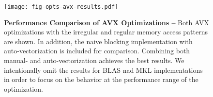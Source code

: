 
\begin{figure}[b]

  \centering
  \texttt{[image: fig-opts-avx-results.pdf]}

  \caption{\textbf{Performance Comparison of AVX Optimizations --}
    Both AVX optimizations with the irregular and regular memory access
    patterns are shown. In addition, the naive blocking implementation
    with auto-vectorization is included for comparison. Combining both
    manual- and auto-vectorization achieves the best results. We
    intentionally omit the results for BLAS nad MKL implementations in
    order to focus on the behavior at the performance range of the
    optimization.}

  \label{fig-opts-avx-results}

\end{figure}
